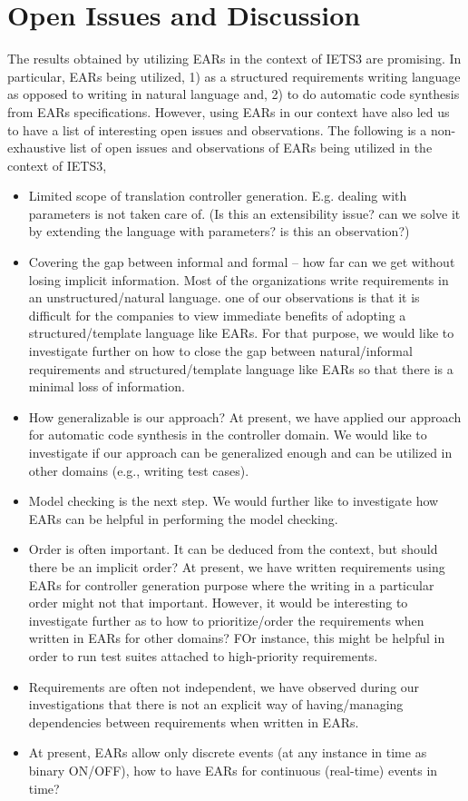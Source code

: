 \section{Open Issues and Discussion}
The results obtained by utilizing EARs in the context of IETS3 are
promising. In particular, EARs being utilized, 1) as a structured
requirements writing language as opposed to writing in natural language and, 2)
to do automatic code synthesis from EARs specifications. However, using EARs in
our context have also led us to have a list of interesting open issues and
observations.
The following is a non-exhaustive list of open issues and observations of EARs
being utilized in the context of IETS3, 
\begin{itemize}
  \item Limited scope of translation controller generation. E.g. dealing with
  parameters is not taken care of. (Is this an extensibility issue? can we
  solve it by extending the language with parameters? is this an observation?)
  \item Covering the gap between informal and formal -- how far can we get
  without losing implicit information. Most of the organizations write
  requirements in an unstructured/natural language. one of our
  observations is that it is difficult for the companies to view immediate
  benefits of adopting a structured/template language like EARs. For that
  purpose, we would like to investigate further on how to close the gap between
  natural/informal requirements and structured/template language like EARs so
  that there is a minimal loss of information.
  \item How generalizable is our approach? At present, we have applied our
  approach for automatic code synthesis in the controller domain. We would like to investigate if our approach can
  be generalized enough and can be utilized in other domains (e.g., writing test
  cases).
  \item Model checking is the next step. We would further like to investigate
  how EARs can be helpful in performing the model checking.
  \item Order is often important. It can be deduced from the context, but should
  there be an implicit order? At present, we have written requirements using
  EARs for controller generation purpose where the writing in a particular order might not that
  important. However, it would be interesting to investigate further as to how
  to prioritize/order the requirements when written in EARs for other domains?
  FOr instance, this might be helpful in order to run test suites attached to
  high-priority requirements.
  \item Requirements are often not independent, we have observed during our
  investigations that there is not an explicit way of having/managing
  dependencies between requirements when written in EARs.
  \item At present, EARs allow only discrete events (at any instance in time
  as binary ON/OFF), how to have EARs for continuous (real-time) events in time? 
\end{itemize}